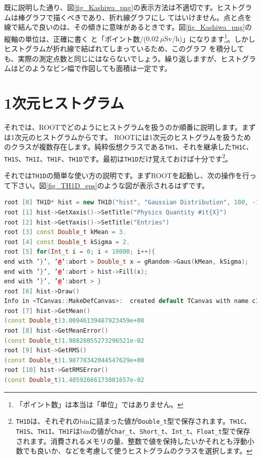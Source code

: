 既に説明した通り、図\ref{fig_Kashiwa_png}の表示方法は不適切です。ヒストグラムは棒グラフで描くべきであり、折れ線グラフにし てはいけません。点と点を線で結んで良いのは、その傾きに意味があるときです。図\ref{fig_Kashiwa_png}の縦軸の単位は、正確に書く と「ポイント数/($0.02\ \mu\mathrm{Sv/h}$)」になります\footnote{「ポイント数」は本当は「単位」ではありません。}。しかしヒストグラムが折れ線で結ばれてしまっているため、このグラフ を積分しても、実際の測定点数と同じにはならないでしょう。繰り返しますが、ヒストグラムはどのようなビン幅で作図しても面積は一定です。

\section{1次元ヒストグラム}

それでは、ROOTでどのようにヒストグラムを扱うのか順番に説明します。まずは1次元のヒストグラムからです。 ROOTには1次元のヒストグラムを扱うためのクラスが複数存在します。純粋仮想クラスである\texttt{TH1}、それを継承した\texttt{TH1C}、\texttt{TH1S}、\texttt{TH1I}、\texttt{TH1F}、\texttt{TH1D}です。最初は\texttt{TH1D}だけ覚えておけば十分です\footnote{\texttt{TH1D}は、それぞれのbinに詰まった値が\texttt{Double\_t}型で保存されます。\texttt{TH1C}、\texttt{TH1S}、\texttt{TH1I}、\texttt{TH1F}はbinの値が\texttt{Char\_t}、\texttt{Short\_t}、\texttt{Int\_t}、\texttt{Float\_t}型で保存されます。消費されるメモリの量、整数で値を保持したいかそれとも浮動小数でも良いか、などを考慮して使うヒストグラムのクラスを選択します。}。

それでは\texttt{TH1D}の簡単な使い方の説明です。まずROOTを起動し、次の操作を行って下さい。図\ref{fig_TH1D_eps}のような図が表示されるはずです。

\begin{lstlisting}[language=c++]
root [0] TH1D* hist = new TH1D("hist", "Gaussian Distribution", 100, -10, 10)
root [1] hist->GetXaxis()->SetTitle("Physics Quantity #it{X}")
root [2] hist->GetYaxis()->SetTitle("Entries")
root [3] const Double_t kMean = 3.
root [4] const Double_t kSigma = 2.
root [5] for(Int_t i = 0; i < 10000; i++){
end with ’}’, ’@’:abort > Double_t x = gRandom->Gaus(kMean, kSigma);
end with ’}’, ’@’:abort > hist->Fill(x);
end with ’}’, ’@’:abort > }
root [6] hist->Draw()
Info in <TCanvas::MakeDefCanvas>:  created default TCanvas with name c1
root [7] hist->GetMean()
(const Double_t)3.00946139487923459e+00
root [8] hist->GetMeanError()
(const Double_t)1.98828055273296521e-02
root [9] hist->GetRMS()
(const Double_t)1.98778342044547629e+00
root [10] hist->GetRMSError()
(const Double_t)1.40592666173881657e-02
\end{lstlisting}

